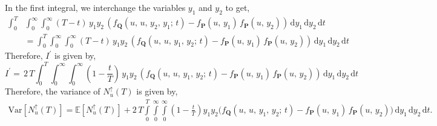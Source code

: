 \documentclass[journal]{IEEEtran}
\theoremstyle{plain}
\theoremstyle{definition}
\theoremstyle{remark}
\newcommand{\E}{\mathbb{E}}
\newcommand{\Nup}{N_u^{\uparrow}(T)}
\newcommand{\dd}{\mathrm{d}}
\newcommand{\Var}{\text{Var}}
\begin{document}
In the first integral, we interchange the variables $y_1$ and $y_2$ to get,
\begin{equation}
\begin{split}
    \int_{0}^T &\int_{0}^\infty \int_{0}^\infty (T-t) \,y_1 y_2 \,\left( f_{\mathbf{Q}}(u, \,u, \,y_2, \,y_1; \, t) - f_{\mathbf{P}}(u,\,y_1) \, f_{\mathbf{P}}(u,\,y_2)\right)\, \dd y_1 \, \dd y_2 \, \dd t 
    \\&= \int_{0}^T \int_{0}^\infty \int_{0}^\infty (T-t) \, y_1 y_2 \,\left( f_{\mathbf{Q}}(u, \,u, \,y_1, \,y_2; \, t) - f_{\mathbf{P}}(u,\,y_1) \, f_{\mathbf{P}}(u,\,y_2)\right)\, \dd y_1 \, \dd y_2 \, \dd t 
\end{split} 
\end{equation}
Therefore, $I^\prime$ is given by,
\begin{equation}
    I^\prime = \, 2 \,T \int_{0}^T \int_{0}^\infty \int_{0}^\infty \left(1-\frac{t}{T}\right) \, y_1 y_2 \,\left( f_{\mathbf{Q}}(u, \,u, \,y_1, \,y_2; \, t) - f_{\mathbf{P}}(u,\,y_1) \, f_{\mathbf{P}}(u,\,y_2)\right)\, \dd y_1 \, \dd y_2 \, \dd t
\end{equation}
Therefore, the variance of $\Nup$ is given by,
\begin{equation}
\begin{aligned}
    \Var\left[\Nup\right] = \E\left[\Nup\right] + 2\,T \int\limits_{0}^T \int\limits_{0}^\infty \int\limits_{0}^\infty \left(1-\frac{t}{T}\right) y_1 y_2 \bigl( f_{\mathbf{Q}}(u, \,u, \,y_1, \,y_2; \, t) - f_{\mathbf{P}}(u,\,y_1) \, f_{\mathbf{P}}(u,\,y_2)\bigr)\, \dd y_1 \, \dd y_2 \, \dd t .
\end{aligned} \label{eq:variance_formula_triple_integral}
\end{equation}
\end{document}
